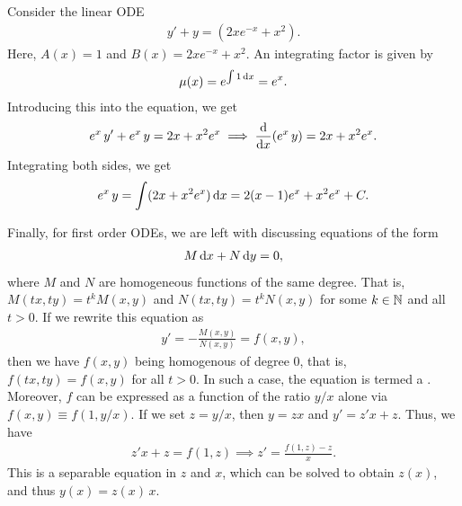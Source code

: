 \begin{example}
    Consider the linear ODE
    \begin{align}
        y' + y = (2xe^{-x} + x^{2}).
    \end{align}
    Here, $A(x) = 1$ and $B(x) = 2xe^{-x} + x^{2}$. An integrating factor is given by
    \begin{align}
        \mu(x) = e^{\int 1 \, \mathrm{d}x} = e^{x}.
    \end{align}
    Introducing this into the equation, we get
    \begin{align}
        e^{x} \, y' + e^{x} \, y = 2x + x^{2} e^{x} \implies \frac{\mathrm{d}}{\mathrm{d}x} (e^{x} \, y) = 2x + x^{2} e^{x}.
    \end{align}
    Integrating both sides, we get
    \begin{align}
        e^{x} \, y = \int (2x + x^{2} e^{x}) \, \mathrm{d}x = 2(x - 1) e^{x} + x^{2} e^{x} + C.
    \end{align}
\end{example}

Finally, for first order ODEs, we are left with discussing equations of the form
\begin{align}
    M \, \mathrm{d}x + N \, \mathrm{d}y = 0,
\end{align}
where $M$ and $N$ are homogeneous functions of the same degree. That is, $M(tx,ty) = t^{k} M(x,y)$ and $N(tx,ty) = t^{k} N(x,y)$ for some $k \in \mathbb{N}$ and all $t > 0$. If we rewrite this equation as
\begin{align}
    y' = -\frac{M(x,y)}{N(x,y)} = f(x,y),
\end{align}
then we have $f(x,y)$ being homogenous of degree $0$, that is, $f(tx,ty) = f(x,y)$ for all $t > 0$. In such a case, the equation is termed a . Moreover, $f$ can be expressed as a function of the ratio $y/x$ alone via $f(x,y) \equiv f(1,y/x)$. If we set $z = y/x$, then $y = zx$ and $y' = z'x + z$. Thus, we have
\begin{align}
    z'x + z = f(1,z) \implies z' = \frac{f(1,z) - z}{x}.
\end{align}
This is a separable equation in $z$ and $x$, which can be solved to obtain $z(x)$, and thus $y(x) = z(x) \, x$.

